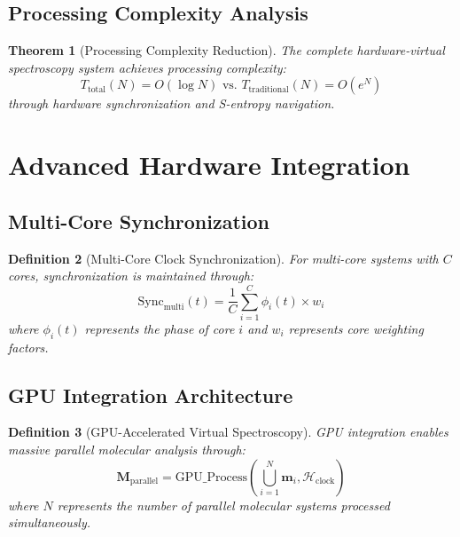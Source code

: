 \documentclass[12pt,a4paper]{article}
\newtheorem{theorem}{Theorem}[section]
\newtheorem{definition}[theorem]{Definition}
\begin{document}
\subsection{Processing Complexity Analysis}

\begin{theorem}[Processing Complexity Reduction]
The complete hardware-virtual spectroscopy system achieves processing complexity:
\begin{equation}
T_{\text{total}}(N) = O(\log N) \text{ vs. } T_{\text{traditional}}(N) = O(e^N)
\end{equation}
through hardware synchronization and S-entropy navigation.
\end{theorem}

\section{Advanced Hardware Integration}

\subsection{Multi-Core Synchronization}

\begin{definition}[Multi-Core Clock Synchronization]
For multi-core systems with $C$ cores, synchronization is maintained through:
\begin{equation}
\text{Sync}_{\text{multi}}(t) = \frac{1}{C} \sum_{i=1}^{C} \phi_i(t) \times w_i
\end{equation}
where $\phi_i(t)$ represents the phase of core $i$ and $w_i$ represents core weighting factors.
\end{definition}

\subsection{GPU Integration Architecture}

\begin{definition}[GPU-Accelerated Virtual Spectroscopy]
GPU integration enables massive parallel molecular analysis through:
\begin{equation}
\mathbf{M}_{\text{parallel}} = \text{GPU\_Process}\left(\bigcup_{i=1}^{N} \mathbf{m}_i, \mathcal{H}_{\text{clock}}\right)
\end{equation}
where $N$ represents the number of parallel molecular systems processed simultaneously.
\end{definition}
\end{document}
